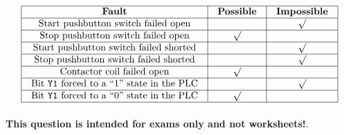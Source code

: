






$$\vbox{\offinterlineskip
\halign{\strut
\vrule \quad\hfil # \ \hfil & 
\vrule \quad\hfil # \ \hfil & 
\vrule \quad\hfil # \ \hfil \vrule \cr
\noalign{\hrule}
%
{\bf Fault} & {\bf Possible} & {\bf Impossible} \cr
%
\noalign{\hrule}
%
Start pushbutton switch failed open &  & $\surd$ \cr
%
\noalign{\hrule}
%
Stop pushbutton switch failed open & $\surd$ &  \cr
%
\noalign{\hrule}
%
Start pushbutton switch failed shorted &  & $\surd$ \cr
%
\noalign{\hrule}
%
Stop pushbutton switch failed shorted &  & $\surd$ \cr
%
\noalign{\hrule}
%
Contactor coil failed open & $\surd$ &  \cr
%
\noalign{\hrule}
%
Bit {\tt Y1} forced to a ``1'' state in the PLC &  & $\surd$ \cr
%
\noalign{\hrule}
%
Bit {\tt Y1} forced to a ``0'' state in the PLC & $\surd$ &  \cr
%
\noalign{\hrule}
} %
}$$ %








{\bf This question is intended for exams only and not worksheets!}.


